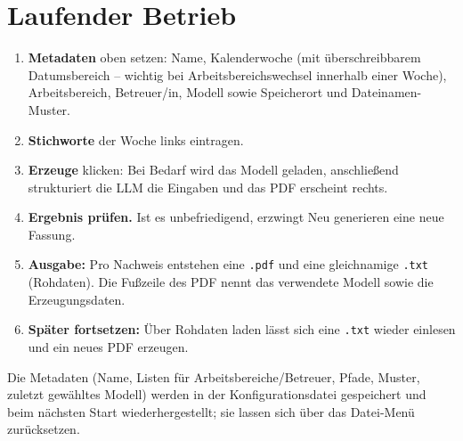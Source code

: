 \documentclass[11pt,a4paper]{article}
\begin{document}
\section{Laufender Betrieb}

\begin{enumerate}
  \item \textbf{Metadaten} oben setzen: Name, Kalenderwoche (mit
        \"uberschreibbarem Datumsbereich -- wichtig bei
        Arbeitsbereichswechsel innerhalb einer Woche), Arbeitsbereich,
        Betreuer/in, Modell sowie Speicherort und Dateinamen-Muster.
  \item \textbf{Stichworte} der Woche links eintragen.
  \item \textbf{\glqq Erzeuge\grqq} klicken: Bei Bedarf wird das Modell geladen,
        anschlie\ss end strukturiert die LLM die Eingaben und das PDF erscheint
        rechts.
  \item \textbf{Ergebnis pr\"ufen.} Ist es unbefriedigend, erzwingt
        \glqq Neu generieren\grqq{} eine neue Fassung.
  \item \textbf{Ausgabe:} Pro Nachweis entstehen eine \texttt{.pdf} und eine
        gleichnamige \texttt{.txt} (Rohdaten). Die Fu\ss zeile des PDF nennt das
        verwendete Modell sowie die Erzeugungsdaten.
  \item \textbf{Sp\"ater fortsetzen:} \"Uber \glqq Rohdaten laden\grqq{} l\"asst
        sich eine \texttt{.txt} wieder einlesen und ein neues PDF erzeugen.
\end{enumerate}

\noindent
Die Metadaten (Name, Listen f\"ur Arbeitsbereiche/Betreuer, Pfade, Muster,
zuletzt gew\"ahltes Modell) werden in der Konfigurationsdatei gespeichert und
beim n\"achsten Start wiederhergestellt; sie lassen sich \"uber das
\glqq Datei\grqq-Men\"u zur\"ucksetzen.
\end{document}
